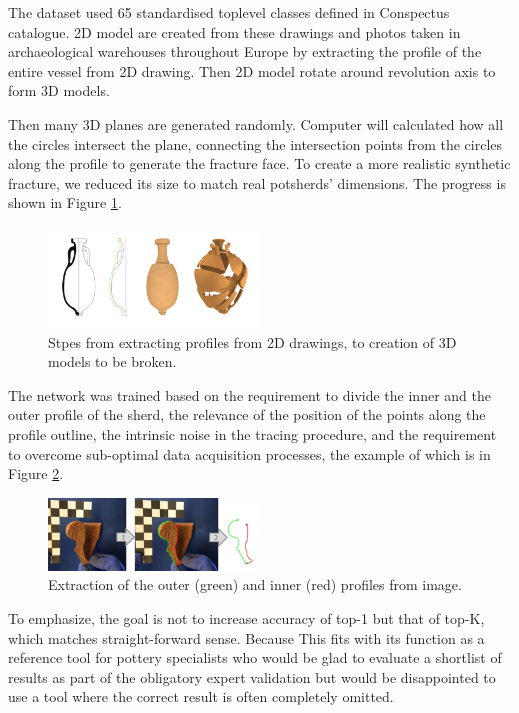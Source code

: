 \documentclass[journal]{IEEEtran}
\begin{document}
	The dataset used 65 standardised toplevel classes defined in Conspectus catalogue\cite{first_phase}. 2D model are created from these drawings and photos taken in archaeological warehouses throughout Europe by extracting the profile of the entire vessel from 2D drawing. Then 2D model rotate around revolution axis to form 3D models.
	
	Then many 3D planes are generated randomly. Computer will calculated how all the circles intersect the plane, connecting the intersection points from the circles along the profile to generate the fracture face. To create a more realistic synthetic fracture, we reduced its size to match real potsherds’ dimensions. \cite{Dellepiane2017FromPT} The progress is shown in Figure \ref{process}.
	
	\begin{figure}[htbp]
		\centering
		\includegraphics[width=0.5\textwidth]{./picture/process.png}
		\caption{Stpes from extracting profiles from 2D drawings, to creation of 3D models to be broken.}
		\label{process}
	\end{figure} 
	
	The network was trained based on the requirement to divide the inner and the outer profile of the sherd, the relevance of the position of the points along the profile outline, the intrinsic noise in the tracing procedure, and the requirement to overcome sub-optimal data acquisition processes\cite{ANICHINI2021102788}, the example of which is in Figure \ref{process2}.
	
	\begin{figure}[htbp]
		\centering
		\includegraphics[width=0.5\textwidth]{./picture/fig4.png}
		\caption{Extraction of the outer (green) and inner (red) profiles from image.}
		\label{process2}
	\end{figure} 
	
	To emphasize, the goal is not to increase accuracy of top-1 but that of top-K, which matches straight-forward sense. Because This fits with its function as a reference tool for pottery specialists who would be glad to evaluate a shortlist of results as part of the obligatory expert validation but would be disappointed to use a tool where the correct result is often completely omitted.
	
\end{document}
